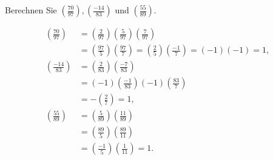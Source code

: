 
\begin{exercise}

Berechnen Sie $\left(\frac{70}{97}\right), \left(\frac{-14}{83}\right)$
und $\left(\frac{55}{89}\right)$.

\end{exercise}


\begin{solution}

\begin{align*}
    \left(\frac{70}{97}\right) &= 
    \left(\frac{2}{97}\right)\left(\frac{5}{97}\right)\left(\frac{7}{97}\right) \\
    &= \left(\frac{97}{5}\right)\left(\frac{97}{7}\right)
    = \left(\frac{2}{5}\right)\left(\frac{-1}{7}\right)
    = (-1)(-1) = 1, \\
    \left(\frac{-14}{83}\right) &= 
    \left(\frac{2}{83}\right)\left(\frac{-7}{83}\right) \\
    &= (-1)\left(\frac{-1}{83}\right)(-1)\left(\frac{83}{7}\right) \\
    &= -\left(\frac{2}{7}\right) = 1, \\
    \left(\frac{55}{89}\right) &= \left(\frac{5}{89}\right)\left(\frac{11}{89}\right) \\
    &= \left(\frac{89}{5}\right)\left(\frac{89}{11}\right) \\
    &= \left(\frac{-1}{5}\right)\left(\frac{1}{11}\right) = 1.
\end{align*}

\end{solution}

